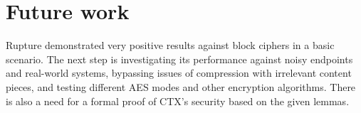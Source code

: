 \section{Future work}

Rupture demonstrated very positive results against block ciphers in a basic
scenario. The next step is investigating its performance against noisy endpoints
and real-world systems, bypassing issues of compression with irrelevant content
pieces, and testing different AES modes and other encryption algorithms. There
is also a need for a formal proof of CTX's security based on the given lemmas.
